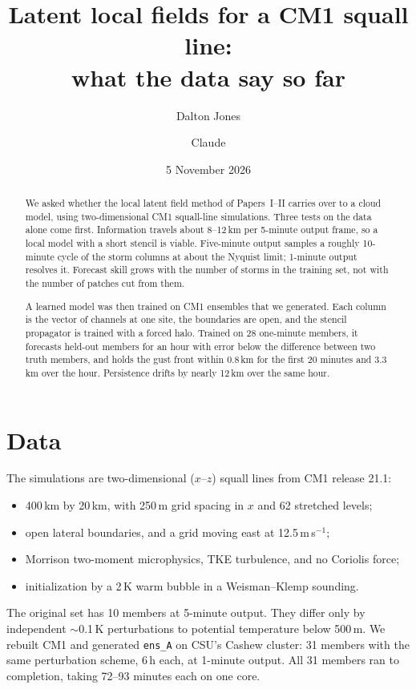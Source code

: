 \documentclass[11pt]{article}
\title{Latent local fields for a CM1 squall line:\\ what the data say so far}
\author{Dalton Jones \and Claude}
\date{5 November 2026}
\begin{document}
\maketitle

\begin{abstract}
We asked whether the local latent field method of Papers~I--II carries over to a cloud model, using two-dimensional CM1 squall-line simulations. Three tests on the data alone come first. Information travels about 8--12\,km per 5-minute output frame, so a local model with a short stencil is viable. Five-minute output samples a roughly 10-minute cycle of the storm columns at about the Nyquist limit; 1-minute output resolves it. Forecast skill grows with the number of storms in the training set, not with the number of patches cut from them.

A learned model was then trained on CM1 ensembles that we generated. Each column is the vector of channels at one site, the boundaries are open, and the stencil propagator is trained with a forced halo. Trained on 28 one-minute members, it forecasts held-out members for an hour with error below the difference between two truth members, and holds the gust front within 0.8\,km for the first 20 minutes and 3.3\,km over the hour. Persistence drifts by nearly 12\,km over the same hour.
\end{abstract}

\section{Data}
The simulations are two-dimensional ($x$--$z$) squall lines from CM1 release 21.1:
\begin{itemize}
\item 400\,km by 20\,km, with 250\,m grid spacing in $x$ and 62 stretched levels;
\item open lateral boundaries, and a grid moving east at 12.5\,m\,s$^{-1}$;
\item Morrison two-moment microphysics, TKE turbulence, and no Coriolis force;
\item initialization by a 2\,K warm bubble in a Weisman--Klemp sounding.
\end{itemize}
The original set has 10 members at 5-minute output. They differ only by independent $\sim$0.1\,K perturbations to potential temperature below 500\,m. We rebuilt CM1 and generated \texttt{ens\_A} on CSU's Cashew cluster: 31 members with the same perturbation scheme, 6\,h each, at 1-minute output. All 31 members ran to completion, taking 72--93 minutes each on one core.
\end{document}
